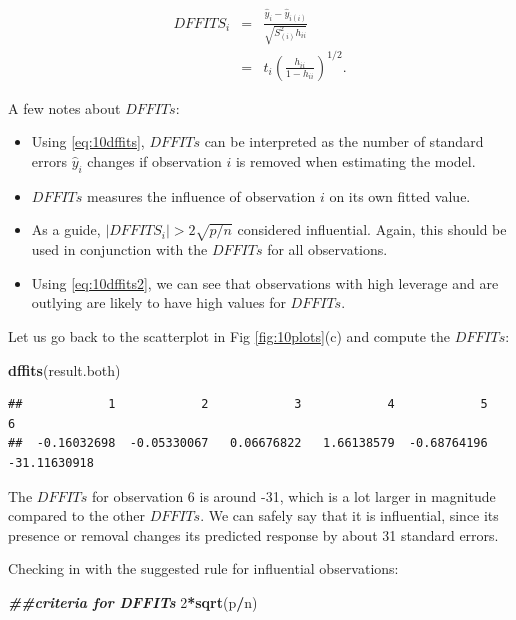 \documentclass[
]{book}
\newenvironment{Shaded}{\begin{snugshade}}{\end{snugshade}}
\newcommand{\DecValTok}[1]{\textcolor[rgb]{0.00,0.00,0.81}{#1}}
\newcommand{\DocumentationTok}[1]{\textcolor[rgb]{0.56,0.35,0.01}{\textbf{\textit{#1}}}}
\newcommand{\FunctionTok}[1]{\textcolor[rgb]{0.13,0.29,0.53}{\textbf{#1}}}
\newcommand{\NormalTok}[1]{#1}
\newcommand{\SpecialCharTok}[1]{\textcolor[rgb]{0.81,0.36,0.00}{\textbf{#1}}}
\providecommand{\tightlist}{%
  \setlength{\itemsep}{0pt}\setlength{\parskip}{0pt}}
\begin{document}
\begin{eqnarray}
DFFITS_i &=& \frac{\hat{y}_i-\hat{y}_{i(i)}}{\sqrt{S^2_{(i)}h_{ii}}} \label{eq:10dffits} \\
                 &=& t_i\left(\frac{h_{ii}}{1-h_{ii}}\right)^{1/2}. \label{eq:10dffits2}
\end{eqnarray}

A few notes about \(DFFITs\):

\begin{itemize}
\tightlist
\item
  Using \eqref{eq:10dffits}, \(DFFITs\) can be interpreted as the number of standard errors \(\hat{y}_i\) changes if observation \(i\) is removed when estimating the model.
\item
  \(DFFITs\) measures the influence of observation \(i\) on its own fitted value.
\item
  As a guide, \(\left|DFFITS_i\right| > 2\sqrt{p/n}\) considered influential. Again, this should be used in conjunction with the \(DFFITs\) for all observations.
\item
  Using \eqref{eq:10dffits2}, we can see that observations with high leverage and are outlying are likely to have high values for \(DFFITs\).
\end{itemize}

Let us go back to the scatterplot in Fig \ref{fig:10plots}(c) and compute the \(DFFITs\):

\begin{Shaded}
\begin{Highlighting}[]
\FunctionTok{dffits}\NormalTok{(result.both)}
\end{Highlighting}
\end{Shaded}

\begin{verbatim}
##            1            2            3            4            5            6 
##  -0.16032698  -0.05330067   0.06676822   1.66138579  -0.68764196 -31.11630918
\end{verbatim}

The \(DFFITs\) for observation 6 is around -31, which is a lot larger in magnitude compared to the other \(DFFITs\). We can safely say that it is influential, since its presence or removal changes its predicted response by about 31 standard errors.

Checking in with the suggested rule for influential observations:

\begin{Shaded}
\begin{Highlighting}[]
\DocumentationTok{\#\#criteria for DFFITs}
\DecValTok{2}\SpecialCharTok{*}\FunctionTok{sqrt}\NormalTok{(p}\SpecialCharTok{/}\NormalTok{n)}
\end{Highlighting}
\end{Shaded}
\end{document}
